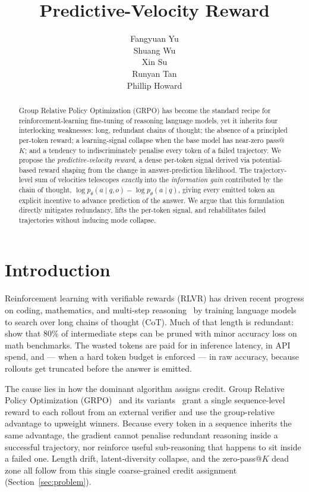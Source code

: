 \documentclass{article}
\title{Predictive-Velocity Reward}
\author{Fangyuan Yu \\
\And
Shuang Wu \\
\And
Xin Su \\
\And
Runyan Tan \\
\And
Phillip Howard \\
}
\begin{document}
\pagestyle{plain}


\maketitle

\begin{abstract}
Group Relative Policy Optimization (GRPO) has become the standard recipe for
reinforcement-learning fine-tuning of reasoning language models, yet it inherits
four interlocking weaknesses: long, redundant chains of thought; the absence
of a principled per-token reward; a learning-signal collapse when the base
model has near-zero pass@\(K\); and a tendency to indiscriminately penalise
every token of a failed trajectory. We propose the
\emph{predictive-velocity reward}, a dense per-token signal derived via
potential-based reward shaping from the change in answer-prediction likelihood.
The trajectory-level sum of velocities telescopes \emph{exactly} into the
\emph{information gain} contributed by the chain of thought,
\(\log p_\theta(a \mid q, o) - \log p_\theta(a \mid q)\), giving every emitted
token an explicit incentive to advance prediction of the answer. We argue that this
formulation directly mitigates redundancy, lifts the per-token signal,
and rehabilitates failed trajectories without inducing mode collapse.
\end{abstract}

\section{Introduction}

Reinforcement learning with verifiable rewards (RLVR) has driven recent
progress on coding, mathematics, and multi-step
reasoning~\citep{deepseek2025r1, kimi2025k15} by training language
models to search over long chains of thought (CoT). Much of that length
is redundant: \citet{li2025stepentropy} show that \(80\%\) of
intermediate steps can be pruned with minor accuracy loss on math
benchmarks. The wasted tokens are paid for in inference latency, in API
spend, and --- when a hard token budget is enforced --- in raw
accuracy, because rollouts get truncated before the answer is emitted.

The cause lies in how the dominant algorithm assigns credit. Group
Relative Policy Optimization (GRPO)~\citep{shao2024deepseekmath,
deepseek2025r1} and its variants~\citep{yu2025dapo, liu2025drgrpo}
grant a single sequence-level reward to each rollout from an external
verifier and use the group-relative advantage to upweight winners.
Because every token in a sequence inherits the same advantage, the
gradient cannot penalise redundant reasoning inside a successful
trajectory, nor reinforce useful sub-reasoning that happens to sit
inside a failed one. Length drift, latent-diversity collapse, and the
zero-pass@\(K\) dead zone all follow from this single coarse-grained
credit assignment (Section~\ref{sec:problem}).
\end{document}

